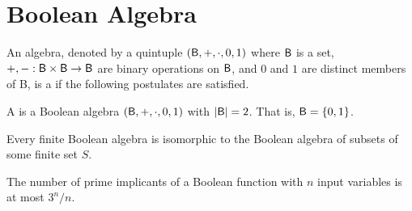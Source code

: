 \documentclass{myproc}
\def\B{\mbox{\sf{}B}}
\begin{document}
\section{Boolean Algebra}
\begin{definition}
An algebra, denoted by a quintuple $(\B, +, \cdot, 0, 1)$ where
$\B$ is a set, $+, -: \B \times \B \rightarrow \B$ 
are binary operations on $\B$, and 
$0$ and $1$ are distinct members of \B, is a 
if the following postulates are satisfied.
\ben
{}
\een
\end{definition}

\begin{definition}
A  is a Boolean algebra $(\B, +, \cdot, 0, 1)$ 
with $|\B| = 2$. That is, $\B = \{0, 1\}$.
\end{definition}

\begin{theorem}
Every finite Boolean algebra is isomorphic to the Boolean algebra of subsets
of some finite set $S$.
\end{theorem}

\begin{theorem}
The number of prime implicants of a Boolean function with $n$ input variables
is at most $3^n/n$.
\end{theorem}






\nocite{Brown03}
\end{document}
